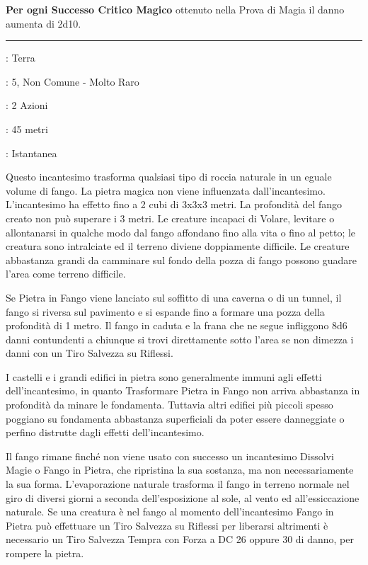 \begin{multicols}{2}
\textbf{Per ogni Successo Critico Magico} ottenuto nella Prova di Magia il danno aumenta di 2d10.

\smallskip\noindent\rule{\linewidth}{2pt} \hypertarget{Pietra in Fango - Fango in Pietra}{}\smallskip{}
\noindent
\begin{description}[noitemsep, topsep=0pt, parsep=0pt, partopsep=0pt, leftmargin=0cm, labelwidth=1.3cm]
	\item[\textbf{Lista}]: Terra
	\item[\textbf{Livello}]: 5, Non Comune - Molto Raro
	\item[\textbf{Lancio}]: 2 Azioni
	\item[\textbf{Gittata}]: 45 metri
	\item[\textbf{Durata}]: Istantanea
\end{description}

Questo incantesimo trasforma qualsiasi tipo di roccia naturale in un eguale volume di fango. La pietra magica non viene influenzata dall'incantesimo. L'incantesimo ha effetto fino a 2 cubi di 3x3x3 metri. La profondità del fango creato non può superare i 3 metri. Le creature incapaci di Volare, levitare o allontanarsi in qualche modo dal fango affondano fino alla vita o fino al petto; le creatura sono intralciate ed il terreno diviene doppiamente difficile. Le creature abbastanza grandi da camminare sul fondo della pozza di fango possono guadare l'area come terreno difficile.

Se Pietra in Fango viene lanciato sul soffitto di una caverna o di un tunnel, il fango si riversa sul pavimento e si espande fino a formare una pozza della profondità di 1 metro. Il fango in caduta e la frana che ne segue infliggono 8d6 danni contundenti a chiunque si trovi direttamente sotto l'area se non dimezza i danni con un Tiro Salvezza su Riflessi.

I castelli e i grandi edifici in pietra sono generalmente immuni agli effetti dell'incantesimo, in quanto Trasformare Pietra in Fango non arriva abbastanza in profondità da minare le fondamenta. Tuttavia altri edifici più piccoli spesso poggiano su fondamenta abbastanza superficiali da poter essere danneggiate o perfino distrutte dagli effetti dell'incantesimo.

Il fango rimane finché non viene usato con successo un incantesimo Dissolvi Magie o Fango in Pietra, che ripristina la sua sostanza, ma non necessariamente la sua forma. L'evaporazione naturale trasforma il fango in terreno normale nel giro di diversi giorni a seconda dell'esposizione al sole, al vento ed all'essiccazione naturale.
Se una creatura è nel fango al momento dell'incantesimo Fango in Pietra può effettuare un Tiro Salvezza su Riflessi per liberarsi altrimenti è necessario un Tiro Salvezza Tempra con Forza a DC 26 oppure 30 di danno, per rompere la pietra.


\end{multicols}
